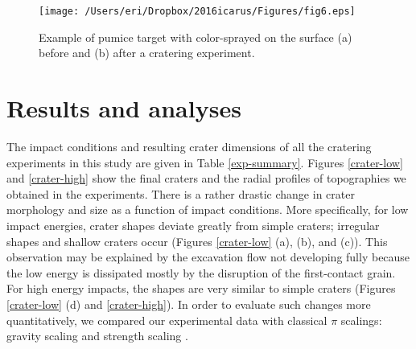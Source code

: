 \documentclass[3p,authoryear]{elsarticle}
\begin{document}
\begin{figure}[htbp]
	\begin{center}
	\texttt{[image: /Users/eri/Dropbox/2016icarus/Figures/fig6.eps]}
	\caption{Example of pumice target with color-sprayed on the surface (a) before and (b) after a cratering experiment.}
	\label{crater-splay}
	\end{center}
\end{figure}

 \section{Results and analyses}\label{sec:classic-pi}
The impact conditions and resulting crater dimensions of all the cratering experiments in this study are given in Table \ref{exp-summary}. Figures \ref{crater-low} and \ref{crater-high} show the final craters and the radial profiles of topographies we obtained in the experiments. There is a rather drastic change in crater morphology and size as a function of impact conditions. More specifically, for low impact energies, crater shapes deviate greatly from simple craters; irregular shapes and shallow craters occur (Figures \ref{crater-low} (a), (b), and (c)). This observation may be explained by the excavation flow not developing fully because the low energy is dissipated mostly by the disruption of the first-contact grain. For high energy impacts, the shapes are very similar to simple craters (Figures \ref{crater-low} (d) and \ref{crater-high}). In order to evaluate such changes more quantitatively, we compared our experimental data with classical $\pi$ scalings: gravity scaling and strength scaling \citep[e.g.][]{holsapple1993}.
\end{document}
